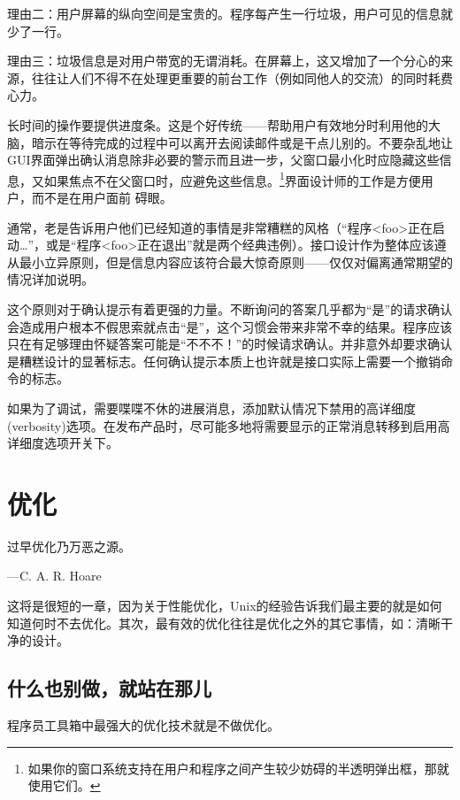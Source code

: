 \documentclass[12pt,oneside]{ctexbook}
\begin{document}
\begin{common-format}
理由二：用户屏幕的纵向空间是宝贵的。程序每产生一行垃圾，用户可见的信息就少了一行。

理由三：垃圾信息是对用户带宽的无谓消耗。在屏幕上，这又增加了一个分心的来源，往往让人们不得不在处理更重要的前台工作（例如同他人的交流）的同时耗费心力。

长时间的操作要提供进度条。这是个好传统——帮助用户有效地分时利用他的大脑，暗示在等待完成的过程中可以离开去阅读邮件或是干点儿别的。不要杂乱地让GUI界面弹出确认消息除非必要的警示而且进一步，父窗口最小化时应隐藏这些信息，又如果焦点不在父窗口时，应避免这些信息。\footnote{如果你的窗口系统支持在用户和程序之间产生较少妨碍的半透明弹出框，那就使用它们。}界面设计师的工作是方便用户，而不是在用户面前
碍眼。

通常，老是告诉用户他们已经知道的事情是非常糟糕的风格（“程序<foo>正在启动…”，或是“程序<foo>正在退出”就是两个经典违例）。接口设计作为整体应该遵从最小立异原则，但是信息内容应该符合最大惊奇原则——仅仅对偏离通常期望的情况详加说明。

这个原则对于确认提示有着更强的力量。不断询问的答案几乎都为“是”的请求确认会造成用户根本不假思索就点击“是”，这个习惯会带来非常不幸的结果。程序应该只在有足够理由怀疑答案可能是“不不不！”的时候请求确认。并非意外却要求确认是糟糕设计的显著标志。任何确认提示本质上也许就是接口实际上需要一个撤销命令的标志。

如果为了调试，需要喋喋不休的进展消息，添加默认情况下禁用的高详细度(verbosity)选项。在发布产品时，尽可能多地将需要显示的正常消息转移到启用高详细度选项开关下。



\chapter{优化}
\begin{flushright}
\begin{notecard}{15em}
过早优化乃万恶之源。

{\hfill —C. A. R. Hoare}
\end{notecard}
\end{flushright}

这将是很短的一章，因为关于性能优化，Unix的经验告诉我们最主要的就是如何知道何时不去优化。其次，最有效的优化往往是优化之外的其它事情，如：清晰干净的设计。

\section{什么也别做，就站在那儿}
程序员工具箱中最强大的优化技术就是不做优化。


\end{common-format}
\end{document}
